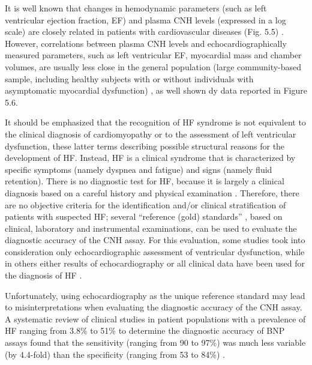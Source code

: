 \documentclass[14pt,a4paper,onecolumn]{extarticle}
\begin{document}
It is well known that changes in hemodynamic parameters (such as left ventricular ejection fraction, EF) and plasma CNH levels (expressed in a log scale) are closely related in patients with cardiovascular diseases (Fig. 5.5) \citep{bib32} \citep{bib33} \citep{bib34} \citep{bib35} \citep{bib319} \citep{bib358} \citep{bib359} \citep{bib360} \citep{bib361} \citep{bib362} \citep{bib363} \citep{bib364} \citep{bib365}. However, correlations between plasma CNH levels and echocardiographically measured parameters, such as left ventricular EF, myocardial mass and chamber volumes, are usually less close in the general population (large community-based sample, including healthy subjects with or without individuals with asymptomatic myocardial dysfunction) \citep{bib38} \citep{bib39} \citep{bib366} \citep{bib367}, as well shown dy data reported in Figure 5.6.

It should be emphasized that the recognition of HF syndrome is not equivalent to the clinical diagnosis of cardiomyopathy or to the assessment of left ventricular dysfunction, these latter terms describing possible structural reasons for the development of HF. Instead, HF is a clinical syndrome that is characterized by specific symptoms (namely dyspnea and fatigue) and signs (namely fluid retention). There is no diagnostic test for HF, because it is largely a clinical diagnosis based on a careful history and physical examination \citep{bib368}. Therefore, there are no objective criteria for the identification and/or clinical stratification of patients with suspected HF; several “reference (gold) standards” \citep{bib371}, based on clinical, laboratory and instrumental examinations, can be used to evaluate the diagnostic accuracy of the CNH assay. For this evaluation, some studies took into consideration only echocardiographic assessment of ventricular dysfunction, while in others either results of echocardiography or all clinical data have been used for the diagnosis of HF \citep{bib35}.

Unfortunately, using echocardiography as the unique reference standard may lead to misinterpretations when evaluating the diagnostic accuracy of the CNH assay. A systematic review of clinical studies in patient populations with a prevalence of HF ranging from 3.8\% to 51\% to determine the diagnostic accuracy of BNP assays found that the sensitivity (ranging from 90 to 97\%) was much less variable (by 4.4-fold) than the specificity (ranging from 53 to 84\%) \citep{bib35}.
\end{document}
